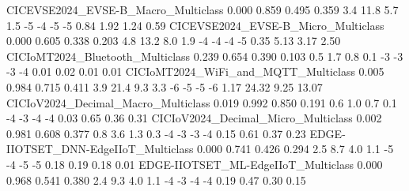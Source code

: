 CICEVSE2024_EVSE-B_Macro_Multiclass                                      0.000      0.859       0.495      0.359                   3.4                  11.8                    5.7                   1.5              -5              -4               -5              -5               0.84               1.92                1.24               0.59
CICEVSE2024_EVSE-B_Micro_Multiclass                                      0.000      0.605       0.338      0.203                   4.8                  13.2                    8.0                   1.9              -4              -4               -4              -5               0.35               5.13                3.17               2.50
CICIoMT2024_Bluetooth_Multiclass                                         0.239      0.654       0.390      0.103                   0.5                   1.7                    0.8                   0.1              -3              -3               -3              -4               0.01               0.02                0.01               0.01
CICIoMT2024_WiFi_and_MQTT_Multiclass                                     0.005      0.984       0.715      0.411                   3.9                  21.4                    9.3                   3.3              -6              -5               -5              -6               1.17              24.32                9.25              13.07
CICIoV2024_Decimal_Macro_Multiclass                                      0.019      0.992       0.850      0.191                   0.6                   1.0                    0.7                   0.1              -4              -3               -4              -4               0.03               0.65                0.36               0.31
CICIoV2024_Decimal_Micro_Multiclass                                      0.002      0.981       0.608      0.377                   0.8                   3.6                    1.3                   0.3              -4              -3               -3              -4               0.15               0.61                0.37               0.23
EDGE-IIOTSET_DNN-EdgeIIoT_Multiclass                                     0.000      0.741       0.426      0.294                   2.5                   8.7                    4.0                   1.1              -5              -4               -5              -5               0.18               0.19                0.18               0.01
EDGE-IIOTSET_ML-EdgeIIoT_Multiclass                                      0.000      0.968       0.541      0.380                   2.4                   9.3                    4.0                   1.1              -4              -3               -4              -4               0.19               0.47                0.30               0.15
